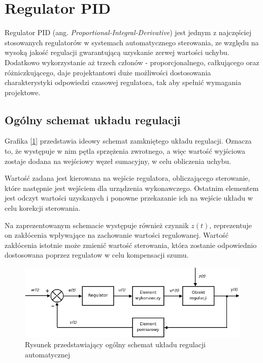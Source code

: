 \clearpage

\section{Regulator PID}

Regulator PID (ang. \textit{Proportional-Integral-Derivative}) jest jednym z najczęściej stosowanych regulatorów w systemach automatycznego sterowania, ze względu na wysoką jakość regulacji gwarantującą uzyskanie zerwej wartości uchybu. Dodatkowo wykorzystanie aż trzech członów - proporcjonalnego, całkującego oraz różniczkującego, daje projektantowi duże możliwości dostosowania charakterystyki odpowiedzi czasowej regulatora, tak aby spełnić wymagania projektowe. 

\subsection{Ogólny schemat układu regulacji}

Grafika [\ref{rys2:regulacja1}] przedstawia ideowy schemat zamkniętego układu regulacji. Oznacza to, że występuje w nim pętla sprzężenia zwrotnego, a więc wartość wyjściowa zostaje dodana na wejściowy węzeł sumacyjny, w celu obliczenia uchybu. 

Wartość zadana jest kierowana na wejście regulatora, obliczającego sterowanie, które następnie jest wejściem dla urządzenia wykonawczego. Ostatnim elementem jest odczyt wartości uzyskanych i ponowne przekazanie ich na wejście układu w celu korekcji sterowania.

Na zaprezentowanym schemacie występuje również czynnik \(z(t)\), reprezentuje on zakłócenia wpływające na zachowanie wartości regulowanej. Wartość zakłócenia istotnie może zmienić wartość sterowania, która zostanie odpowiednio dostosowana poprzez regulatow w celu kompensacji szumu. 

\begin{figure}[h]
    \centering
    \includegraphics[width=1.0\textwidth]{./graf/regulacja1.png}
    \caption{Rysunek przedstawiający ogólny schemat układu regulacji automatycznej \cite{bib:wiki-regulacja}}
    \label{rys2:regulacja1}
\end{figure}

